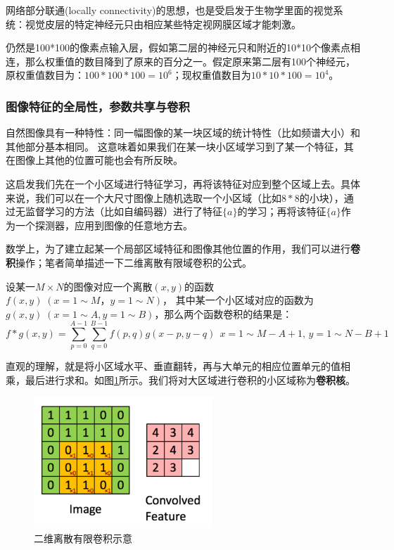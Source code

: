 网络部分联通(locally connectivity)的思想，也是受启发于生物学里面的视觉系统：视觉皮层的特定神经元只由相应某些特定视网膜区域才能刺激。

仍然是100*100的像素点输入层，假如第二层的神经元只和附近的10*10个像素点相连，那么权重值的数目降到了原来的百分之一。假定原来第二层有100个神经元，原权重值数目为：$100*100*100 = 10^6$；现权重值数目为$10*10*100 = 10^4$。


\subsubsection{图像特征的全局性，参数共享与卷积}
自然图像具有一种特性：同一幅图像的某一块区域的统计特性（比如频谱大小）和其他部分基本相同。 \cite{Hyv2009Natural}这意味着如果我们在某一块小区域学习到了某一个特征，其在图像上其他的位置可能也会有所反映。

这启发我们先在一个小区域进行特征学习，再将该特征对应到整个区域上去。具体来说，我们可以在一个大尺寸图像上随机选取一个小区域（比如$8*8$的小块），通过无监督学习的方法（比如自编码器）进行了特征$\{a\}$的学习；再将该特征$\{a\}$作为一个探测器，应用到图像的任意地方去。

数学上，为了建立起某一个局部区域特征和图像其他位置的作用，我们可以进行\textbf{卷积}操作；笔者简单描述一下二维离散有限域卷积的公式。

设某一$M\times N$的图像对应一个离散$(x,y)$的函数
$f(x,y) \;(x = 1\sim M，y = 1\sim N)$，
其中某一个小区域对应的函数为
$g(x,y) \;(x = 1\sim A, y = 1\sim B)$，那么两个函数卷积的结果是：
$$f*g(x,y) = \sum^{A-1}_{p=0} \sum^{B-1}_{q=0} f(p,q)g(x-p,y-q) \,\; x = 1\sim M-A+1, \,y = 1\sim N-B+1$$

直观的理解，就是将小区域水平、垂直翻转，再与大单元的相应位置单元的值相乘，最后进行求和。如图\ref{fig:conv}所示。我们将对大区域进行卷积的小区域称为\textbf{卷积核}。

\begin{figure}[htbp]
   \centering
   \includegraphics[width=0.6\textwidth]{Convolution.png} %
   \caption{二维离散有限卷积示意}
   \label{fig:conv}
\end{figure}

